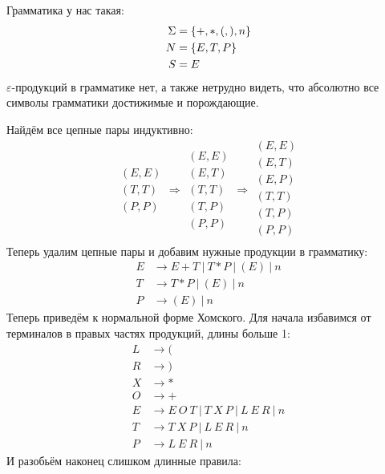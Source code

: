 \begin{solution}
Грамматика у нас такая:
	\begin{align*}
		\Sigma &= \left\lbrace +, *, (, ), n \right\rbrace \\
		N &= \left\lbrace E, T, P \right\rbrace\\
		S &= E
	\end{align*}
$\varepsilon$-продукций в грамматике нет, а также нетрудно видеть, что абсолютно все символы грамматики достижимые и порождающие. 

Найдём все цепные пары индуктивно:
\[
	\begin{array}{l}
		(E, E)\\ (T, T)\\ (P, P)
	\end{array}
	\Rightarrow
	\begin{array}{l}
		(E, E)\\ (E, T)\\ (T, T)\\ (T, P)\\ (P, P)  
	\end{array}
	\Rightarrow
	\begin{array}{l}
		(E, E)\\ (E, T)\\ (E, P)\\ (T, T)\\ (T, P)\\ (P, P)\\  
	\end{array}
\]
Теперь удалим цепные пары и добавим нужные продукции в грамматику:
	\begin{align*}
		E &\rightarrow E + T\ |\ T * P\ |\ (E)\ |\ n\\
		T &\rightarrow T * P\ |\ (E)\ |\ n \\
		P &\rightarrow (E)\ |\ n
	\end{align*}
Теперь приведём к нормальной форме Хомского. Для начала избавимся от терминалов в правых частях продукций, длины больше 1:
	\begin{align*}
		L &\rightarrow (\\
		R &\rightarrow )\\
		X &\rightarrow *\\
		O &\rightarrow +\\
		E &\rightarrow E\ O\ T\ |\ T\ X\ P\ |\ L\ E\ R\ |\ n\\
		T &\rightarrow T\ X\ P\ |\ L\ E\ R\ |\ n \\
		P &\rightarrow L\ E\ R\ |\ n 
	\end{align*}
И разобьём наконец слишком длинные правила:

\end{solution}
